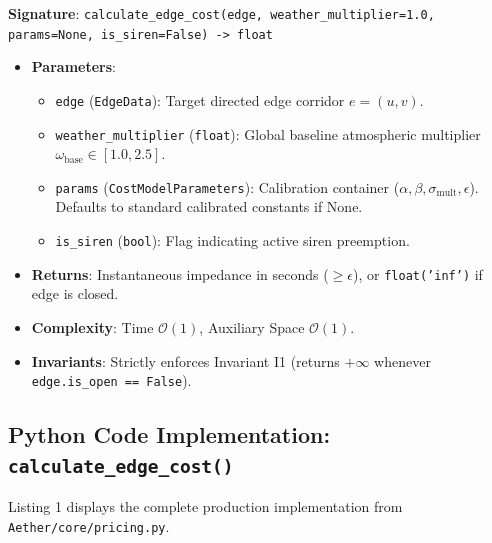 \documentclass[10pt,a4paper]{article}
\begin{document}
\begin{tcolorbox}[
  enhanced,
  colback=brandsurface,
  colframe=brandborder,
  boxrule=0.7pt,
  arc=3pt,
  title={\sffamily\scriptsize\bfseries\color{brandnavy}Function Specification: \texttt{calculate\_edge\_cost()}},
  coltitle=brandnavy,
  colbacktitle=brandcard,
  top=4pt, bottom=4pt, left=8pt, right=8pt
]
\sffamily\footnotesize
\textbf{Signature}: \texttt{calculate\_edge\_cost(edge, weather\_multiplier=1.0, params=None, is\_siren=False) -> float}
\begin{itemize}\setlength{\itemsep}{1.5pt}\setlength{\topsep}{1pt}
  \item \textbf{Parameters}:
    \begin{itemize}\setlength{\itemsep}{1pt}
      \item \texttt{edge} (\texttt{EdgeData}): Target directed edge corridor $e = (u, v)$.
      \item \texttt{weather\_multiplier} (\texttt{float}): Global baseline atmospheric multiplier $\omega_{\text{base}} \in [1.0, 2.5]$.
      \item \texttt{params} (\texttt{CostModelParameters}): Calibration container ($\alpha, \beta, \sigma_{\text{mult}}, \epsilon$). Defaults to standard calibrated constants if None.
      \item \texttt{is\_siren} (\texttt{bool}): Flag indicating active siren preemption.
    \end{itemize}
  \item \textbf{Returns}: Instantaneous impedance in seconds ($\ge \epsilon$), or \texttt{float('inf')} if edge is closed.
  \item \textbf{Complexity}: Time $\mathcal{O}(1)$, Auxiliary Space $\mathcal{O}(1)$.
  \item \textbf{Invariants}: Strictly enforces Invariant I1 (returns $+\infty$ whenever \texttt{edge.is\_open == False}).
\end{itemize}
\end{tcolorbox}

\newpage
\subsection{Python Code Implementation: \texttt{calculate\_edge\_cost()}}
Listing 1 displays the complete production implementation from \texttt{Aether/core/pricing.py}.
\end{document}
